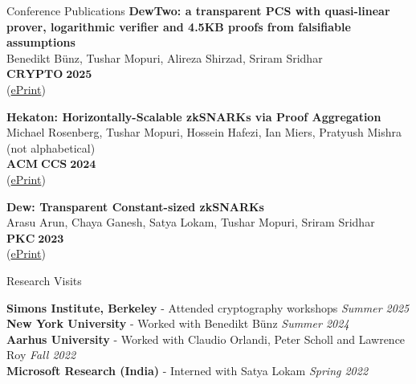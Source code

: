 \documentclass[
	11pt, %
]{resume} %
\begin{document}
\begin{rSection}{Conference Publications}
        \textbf{DewTwo: a transparent PCS with quasi-linear prover, logarithmic verifier and 4.5KB proofs from falsifiable assumptions} \\ 
	Benedikt Bünz, Tushar Mopuri, Alireza Shirzad, Sriram Sridhar \\
        $\mathbf{CRYPTO} \; \mathbf{2025}$ \\
        (\href{https://eprint.iacr.org/2025/129}{ePrint})

        \textbf{Hekaton: Horizontally-Scalable zkSNARKs via Proof Aggregation} \\ 
	Michael Rosenberg, Tushar Mopuri, Hossein Hafezi, Ian Miers, Pratyush Mishra (not alphabetical) \\
        $\mathbf{ACM} \; \mathbf{CCS} \; \mathbf{2024}$ \\
        (\href{https://eprint.iacr.org/2024/1208}{ePrint})

        \textbf{Dew: Transparent Constant-sized zkSNARKs} \\ 
	Arasu Arun, Chaya Ganesh, Satya Lokam, Tushar Mopuri, Sriram Sridhar \\
        $\mathbf{PKC} \; \mathbf{2023}$ \\
        (\href{https://eprint.iacr.org/2022/419}{ePrint})

\end{rSection}


\begin{rSection}{Research Visits}

        \textbf{Simons Institute, Berkeley} - Attended cryptography workshops \hfill \textit{Summer 2025} \\ 
        \textbf{New York University} - Worked with Benedikt Bünz \hfill \textit{Summer 2024} \\ 
        \textbf{Aarhus University} - Worked with Claudio Orlandi, Peter Scholl and Lawrence Roy \hfill \textit{Fall 2022} \\ 
        \textbf{Microsoft Research (India)} - Interned with Satya Lokam \hfill \textit{Spring 2022}

\end{rSection}


\end{document}
